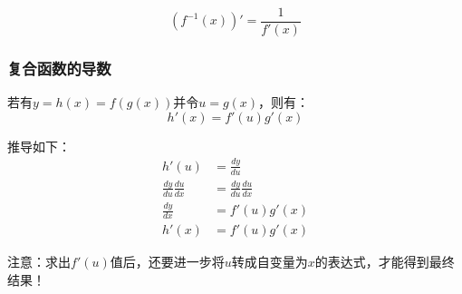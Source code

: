 \documentclass[12pt]{article}
\begin{document}
\begin{equation*}
(f^{-1}(x))' = \frac{1}{f'(x)}
\end{equation*}

\subsubsection{复合函数的导数}

若有$y = h(x) = f(g(x))$并令$u = g(x)$，则有：\\

\begin{equation*}
h'(x) = f'(u)g'(x)
\end{equation*}

推导如下：\\

\begin{equation*}
\begin{aligned}
h'(u) &= \frac{dy}{du}\\
\frac{dy}{du}\frac{du}{dx} &= \frac{dy}{du}\frac{du}{dx}\\
\frac{dy}{dx} &= f'(u)g'(x)\\
h'(x) &= f'(u)g'(x)
\end{aligned}
\end{equation*}

注意：求出$f'(u)$值后，还要进一步将$u$转成自变量为$x$的表达式，才能得到最终结果！
\end{document}
